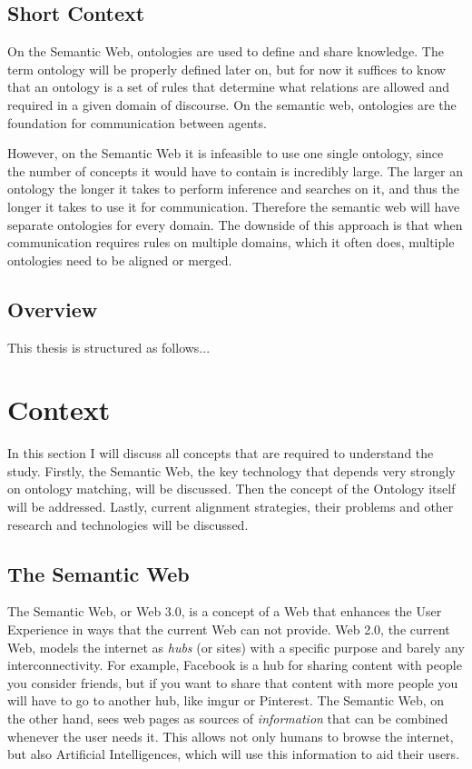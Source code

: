 \documentclass{article}
\begin{document}
 \subsection{Short Context}
 On the Semantic Web, ontologies are used to define and share knowledge. The term ontology will be properly defined later on, but for now it suffices to know that an ontology is a set of rules that determine what relations are allowed and required in a given domain of discourse. On the semantic web, ontologies are the foundation for communication between agents.
 
 However, on the Semantic Web it is infeasible to use one single ontology, since the number of concepts it would have to contain is incredibly large. The larger an ontology the longer it takes to perform inference and searches on it, and thus the longer it takes to use it for communication. Therefore the semantic web will have separate ontologies for every domain. The downside of this approach is that when communication requires rules on multiple domains, which it often does, multiple ontologies need to be aligned or merged.
 
 
 \subsection{Overview}
 This thesis is structured as follows...
 
\section{Context}
 In this section I will discuss all concepts that are required to understand the study. Firstly, the Semantic Web, the key technology that depends very strongly on ontology matching, will be discussed. Then the concept of the Ontology itself will be addressed. Lastly, current alignment strategies, their problems and other research and technologies will be discussed.
 \subsection{The Semantic Web}
 The Semantic Web, or Web 3.0, is a concept of a Web that enhances the User Experience in ways that the current Web can not provide. Web 2.0, the current Web, models the internet as \textit{hubs} (or sites) with a specific purpose and barely any interconnectivity. For example, Facebook is a hub for sharing content with people you consider friends, but if you want to share that content with more people you will have to go to another hub, like imgur or Pinterest.
The Semantic Web, on the other hand, sees web pages as sources of \textit{information} that can be combined whenever the user needs it. This allows not only humans to browse the internet, but also Artificial Intelligences, which will use this information to aid their users.
\end{document}
